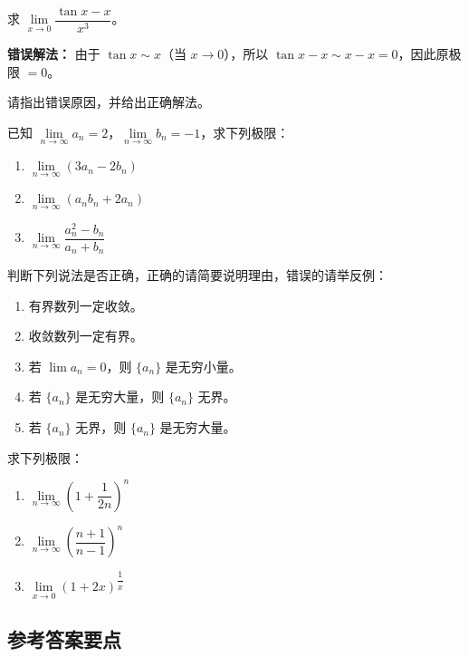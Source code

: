 \documentclass[fontset=fandol]{ctexart}
\begin{document}
\begin{exercise}
求 \(\lim\limits_{x\to 0} \dfrac{\tan x - x}{x^3}\)。

\textbf{错误解法：}
由于 \(\tan x \sim x\)（当 \(x \to 0\)），所以 \(\tan x - x \sim x - x = 0\)，因此原极限 \(= 0\)。

请指出错误原因，并给出正确解法。
\end{exercise}

\begin{exercise}已知 \(\lim\limits_{n\to\infty} a_n = 2\)，\(\lim\limits_{n\to\infty} b_n = -1\)，求下列极限：
\begin{enumerate}
\item \(\lim\limits_{n\to\infty} (3a_n - 2b_n)\)
\item \(\lim\limits_{n\to\infty} (a_n b_n + 2a_n)\)
\item \(\lim\limits_{n\to\infty} \dfrac{a_n^2 - b_n}{a_n + b_n}\)
\end{enumerate}
\end{exercise}

\begin{exercise}判断下列说法是否正确，正确的请简要说明理由，错误的请举反例：
\begin{enumerate}
\item 有界数列一定收敛。
\item 收敛数列一定有界。
\item 若 \(\lim a_n = 0\)，则 \(\{a_n\}\) 是无穷小量。
\item 若 \(\{a_n\}\) 是无穷大量，则 \(\{a_n\}\) 无界。
\item 若 \(\{a_n\}\) 无界，则 \(\{a_n\}\) 是无穷大量。
\end{enumerate}
\end{exercise}

\begin{exercise}求下列极限：
\begin{enumerate}
\item \(\lim\limits_{n\to\infty} \left(1 + \dfrac{1}{2n}\right)^n\)
\item \(\lim\limits_{n\to\infty} \left(\dfrac{n+1}{n-1}\right)^n\)
\item \(\lim\limits_{x\to 0} (1 + 2x)^{\dfrac{1}{x}}\)
\end{enumerate}
\end{exercise}

\clearpage

\subsection*{参考答案要点}
\end{document}

